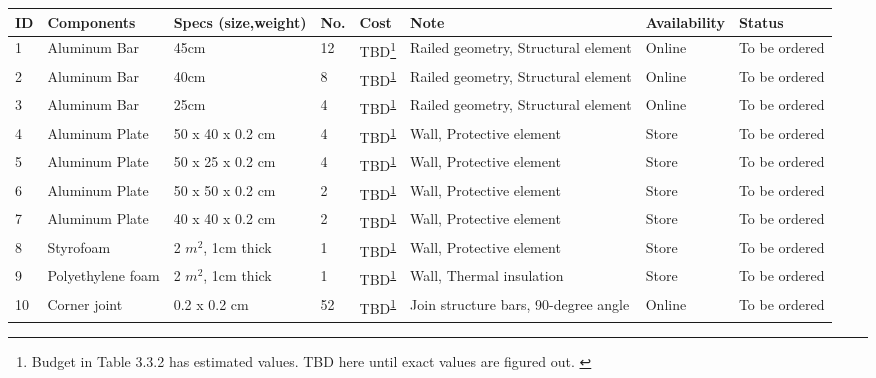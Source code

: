 \begin{longtable}{|m{}|m{}|m{}|m{}|m{}|m{}|m{}|m{}|}
     
   
\hline
\textbf{ID} & \textbf{Components} & \textbf{Specs (size,weight)} & \textbf{No.} & \textbf{Cost} & \textbf{Note} & \textbf{Availability} & \textbf{Status} \\ \hline
1 & Aluminum Bar & 45cm & 12 & TBD\footnote{Budget in Table 3.3.2 has estimated values. TBD here until exact values are figured out. \label{fn:mechcomp1}} & Railed geometry, Structural element & Online & To be ordered \\ \hline
2 & Aluminum Bar & 40cm & 8 & TBD\textsuperscript{\ref{fn:mechcomp1}} & Railed geometry, Structural element & Online & To be ordered \\ \hline
3 & Aluminum Bar & 25cm & 4 & TBD\textsuperscript{\ref{fn:mechcomp1}} & Railed geometry, Structural element & Online & To be ordered \\ \hline
4 & Aluminum Plate & 50 x 40 x 0.2 cm & 4 & TBD\textsuperscript{\ref{fn:mechcomp1}} & Wall, Protective element & Store & To be ordered \\ \hline
5 & Aluminum Plate & 50 x 25 x 0.2 cm & 4 & TBD\textsuperscript{\ref{fn:mechcomp1}} & Wall, Protective element & Store & To be ordered \\ \hline
6 & Aluminum Plate & 50 x 50 x 0.2 cm & 2 & TBD\textsuperscript{\ref{fn:mechcomp1}} & Wall, Protective element & Store & To be ordered \\ \hline
7 & Aluminum Plate & 40 x 40 x 0.2 cm & 2 & TBD\textsuperscript{\ref{fn:mechcomp1}} & Wall, Protective element & Store & To be ordered \\ \hline
8 & Styrofoam & 2 $m^2$, 1cm thick & 1 & TBD\textsuperscript{\ref{fn:mechcomp1}} & Wall, Protective element & Store & To be ordered \\ \hline
9 & Polyethylene foam & 2 $m^2$, 1cm thick & 1 & TBD\textsuperscript{\ref{fn:mechcomp1}} & Wall, Thermal insulation & Store & To be ordered \\ \hline
10 & Corner joint & 0.2 x 0.2 cm & 52 & TBD\textsuperscript{\ref{fn:mechcomp1}} & Join structure bars, 90-degree angle & Online & To be ordered \\ \hline

\end{longtable}
